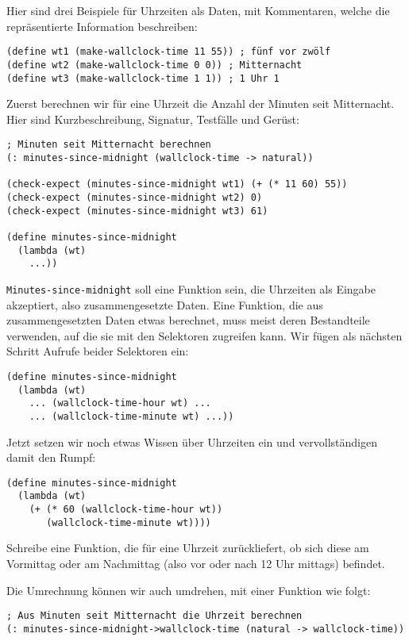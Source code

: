Hier sind drei Beispiele für Uhrzeiten als Daten, mit Kommentaren,
welche die repräsentierte Information beschreiben:
%
\begin{lstlisting}
(define wt1 (make-wallclock-time 11 55)) ; fünf vor zwölf
(define wt2 (make-wallclock-time 0 0)) ; Mitternacht
(define wt3 (make-wallclock-time 1 1)) ; 1 Uhr 1
\end{lstlisting}
%
Zuerst berechnen wir für eine Uhrzeit die Anzahl der Minuten
seit Mitternacht.  Hier sind Kurzbeschreibung, Signatur, Testfälle und Gerüst:
%
\begin{lstlisting}
; Minuten seit Mitternacht berechnen
(: minutes-since-midnight (wallclock-time -> natural))

(check-expect (minutes-since-midnight wt1) (+ (* 11 60) 55))
(check-expect (minutes-since-midnight wt2) 0)
(check-expect (minutes-since-midnight wt3) 61)

(define minutes-since-midnight
  (lambda (wt)
    ...))
\end{lstlisting}
%
\lstinline{Minutes-since-midnight} soll eine Funktion sein, die
Uhrzeiten als Eingabe akzeptiert, also zusammengesetzte Daten.  Eine
Funktion, die aus zusammengesetzten Daten etwas berechnet, muss meist
deren Bestandteile verwenden, auf die sie mit den Selektoren zugreifen
kann.  Wir fügen als nächsten Schritt Aufrufe beider Selektoren ein:
%
\begin{lstlisting}
(define minutes-since-midnight
  (lambda (wt)
    ... (wallclock-time-hour wt) ...
    ... (wallclock-time-minute wt) ...))
\end{lstlisting}
%
Jetzt setzen wir noch etwas Wissen über Uhrzeiten ein und
vervollständigen damit den Rumpf:
%
\begin{lstlisting}
(define minutes-since-midnight
  (lambda (wt)
    (+ (* 60 (wallclock-time-hour wt))
       (wallclock-time-minute wt))))
\end{lstlisting}
%
\begin{aufgabeinline}
  Schreibe eine Funktion, die für eine Uhrzeit zurückliefert, ob sich
  diese am Vormittag oder am Nachmittag (also vor oder nach 12 Uhr
  mittags) befindet.
\end{aufgabeinline}
%
Die Umrechnung können wir auch umdrehen, mit einer Funktion wie folgt:
%
\begin{lstlisting}
; Aus Minuten seit Mitternacht die Uhrzeit berechnen
(: minutes-since-midnight->wallclock-time (natural -> wallclock-time))
\end{lstlisting}
